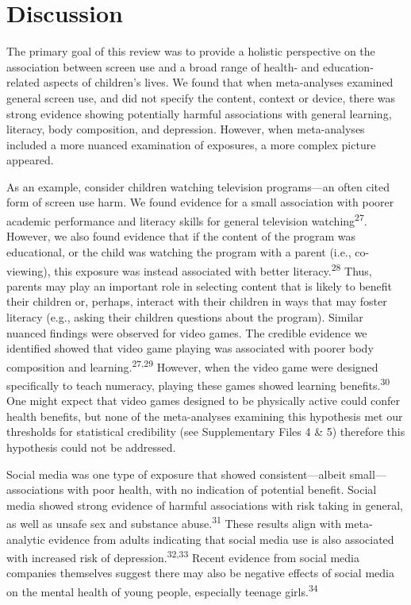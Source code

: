 \documentclass[
  english,
  man]{apa6}
\begin{document}
\hypertarget{discussion}{%
\section{Discussion}\label{discussion}}

The primary goal of this review was to provide a holistic perspective on the association between screen use and a broad range of health- and education-related aspects of children's lives.
We found that when meta-analyses examined general screen use, and did not specify the content, context or device, there was strong evidence showing potentially harmful associations with general learning, literacy, body composition, and depression.
However, when meta-analyses included a more nuanced examination of exposures, a more complex picture appeared.

As an example, consider children watching television programs---an often cited form of screen use harm.
We found evidence for a small association with poorer academic performance and literacy skills for general television watching\textsuperscript{27}.
However, we also found evidence that if the content of the program was educational, or the child was watching the program with a parent (i.e., co-viewing), this exposure was instead associated with better literacy.\textsuperscript{28}
Thus, parents may play an important role in selecting content that is likely to benefit their children or, perhaps, interact with their children in ways that may foster literacy (e.g., asking their children questions about the program).
Similar nuanced findings were observed for video games.
The credible evidence we identified showed that video game playing was associated with poorer body composition and learning.\textsuperscript{27,29}
However, when the video game were designed specifically to teach numeracy, playing these games showed learning benefits.\textsuperscript{30}
One might expect that video games designed to be physically active could confer health benefits, but none of the meta-analyses examining this hypothesis met our thresholds for statistical credibility (see Supplementary Files 4 \& 5) therefore this hypothesis could not be addressed.

Social media was one type of exposure that showed consistent---albeit small---associations with poor health, with no indication of potential benefit.
Social media showed strong evidence of harmful associations with risk taking in general, as well as unsafe sex and substance abuse.\textsuperscript{31}
These results align with meta-analytic evidence from adults indicating that social media use is also associated with increased risk of depression.\textsuperscript{32,33}
Recent evidence from social media companies themselves suggest there may also be negative effects of social media on the mental health of young people, especially teenage girls.\textsuperscript{34}
\end{document}
